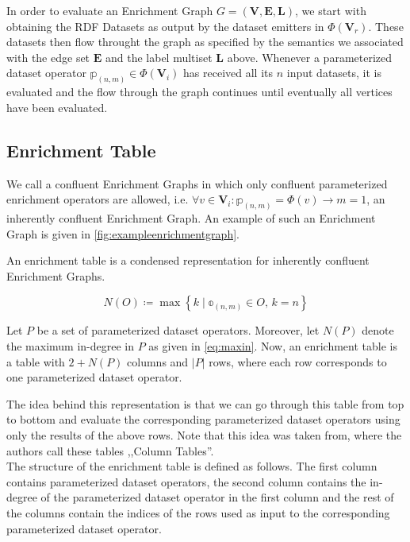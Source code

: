In order to evaluate an Enrichment Graph $G=(\mathbf{V},\mathbf{E},\mathbf{L})$, we start with obtaining the \ac{RDF} Datasets as output by the dataset emitters in $\Phi(\mathbf{V}_r)$.
These datasets then flow throught the graph as specified by the semantics we associated with the edge set $\mathbf{E}$ and the label multiset $\mathbf{L}$ above.
Whenever a parameterized dataset operator $\mathbb{p}_{(n,m)}\in\Phi(\mathbf{V}_i)$ has received all its $n$ input datasets, it is evaluated and the flow through the graph continues until eventually all vertices have been evaluated.

\subsection{Enrichment Table}

We call a confluent Enrichment Graphs in which only confluent parameterized enrichment operators are allowed, i.e. $\forall v \in \mathbf{V}_i \colon \mathbb{p}_{(n,m)} = \Phi(v) \to m = 1$, an inherently confluent Enrichment Graph.
An example of such an Enrichment Graph is given in \autoref{fig:exampleenrichmentgraph}.

An enrichment table is a condensed representation for inherently confluent Enrichment Graphs.

\begin{equation}
  N(O) \coloneq \max \left\{ k \mid \mathbb{o}_{(n,m)} \in O, \, k=n \right\}
  \label{eq:maxin}
\end{equation}

Let $P$ be a set of parameterized dataset operators.
Moreover, let $N(P)$ denote the maximum in-degree in $P$ as given in \ref{eq:maxin}.
Now, an enrichment table is a table with $2+N(P)$ columns and $|P|$ rows, where each row corresponds to one parameterized dataset operator.

The idea behind this representation is that we can go through this table from top to bottom and evaluate the corresponding parameterized dataset operators using only the results of the above rows.
Note that this idea was taken from\cite{kvasnieka:1998a}, where the authors call these tables ,,Column Tables''. \\

The structure of the enrichment table is defined as follows.
The first column contains parameterized dataset operators, the second column contains the in-degree of the parameterized dataset operator in the first column and the rest of the columns contain the indices of the rows used as input to the corresponding parameterized dataset operator.

